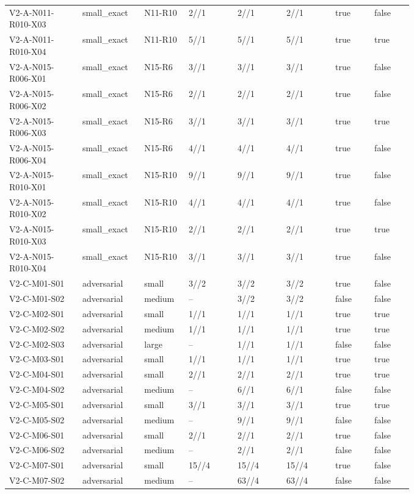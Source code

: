 {\begin{longtable}{p{0.15\linewidth}p{0.09\linewidth}p{0.07\linewidth}p{0.10\linewidth}p{0.10\linewidth}p{0.10\linewidth}p{0.08\linewidth}p{0.08\linewidth}}
V2-A-N011-R010-X03 & small\_exact & N11-R10 & 2//1 & 2//1 & 2//1 & true & false \\
V2-A-N011-R010-X04 & small\_exact & N11-R10 & 5//1 & 5//1 & 5//1 & true & true \\
V2-A-N015-R006-X01 & small\_exact & N15-R6 & 3//1 & 3//1 & 3//1 & true & false \\
V2-A-N015-R006-X02 & small\_exact & N15-R6 & 2//1 & 2//1 & 2//1 & true & false \\
V2-A-N015-R006-X03 & small\_exact & N15-R6 & 3//1 & 3//1 & 3//1 & true & true \\
V2-A-N015-R006-X04 & small\_exact & N15-R6 & 4//1 & 4//1 & 4//1 & true & false \\
V2-A-N015-R010-X01 & small\_exact & N15-R10 & 9//1 & 9//1 & 9//1 & true & false \\
V2-A-N015-R010-X02 & small\_exact & N15-R10 & 4//1 & 4//1 & 4//1 & true & false \\
V2-A-N015-R010-X03 & small\_exact & N15-R10 & 2//1 & 2//1 & 2//1 & true & true \\
V2-A-N015-R010-X04 & small\_exact & N15-R10 & 3//1 & 3//1 & 3//1 & true & false \\
V2-C-M01-S01 & adversarial & small & 3//2 & 3//2 & 3//2 & true & false \\
V2-C-M01-S02 & adversarial & medium & -- & 3//2 & 3//2 & false & false \\
V2-C-M02-S01 & adversarial & small & 1//1 & 1//1 & 1//1 & true & true \\
V2-C-M02-S02 & adversarial & medium & 1//1 & 1//1 & 1//1 & true & true \\
V2-C-M02-S03 & adversarial & large & -- & 1//1 & 1//1 & false & false \\
V2-C-M03-S01 & adversarial & small & 1//1 & 1//1 & 1//1 & true & true \\
V2-C-M04-S01 & adversarial & small & 2//1 & 2//1 & 2//1 & true & true \\
V2-C-M04-S02 & adversarial & medium & -- & 6//1 & 6//1 & false & false \\
V2-C-M05-S01 & adversarial & small & 3//1 & 3//1 & 3//1 & true & true \\
V2-C-M05-S02 & adversarial & medium & -- & 9//1 & 9//1 & false & false \\
V2-C-M06-S01 & adversarial & small & 2//1 & 2//1 & 2//1 & true & false \\
V2-C-M06-S02 & adversarial & medium & -- & 2//1 & 2//1 & false & false \\
V2-C-M07-S01 & adversarial & small & 15//4 & 15//4 & 15//4 & true & false \\
V2-C-M07-S02 & adversarial & medium & -- & 63//4 & 63//4 & false & false \\
\bottomrule
\end{longtable}
}
